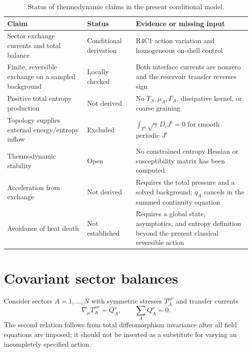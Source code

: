 \documentclass[aps,prd,reprint,superscriptaddress,nofootinbib,floatfix]{revtex4-2}
\newcommand{\Tthree}{T^{3}}
\begin{document}
\begin{table}[t]
\caption{Status of thermodynamic claims in the present conditional model.}
\label{tab:claims}
\begin{ruledtabular}
\begin{tabular}{p{}p{}p{}}
Claim & Status & Evidence or missing input \\
\hline
Sector exchange currents and total balance & Conditional derivation &
R4C1 action variation and homogeneous on-shell control \\
Finite, reversible exchange on a sampled background & Locally checked &
Both interface currents are nonzero and the reservoir transfer reverses sign \\
Positive total entropy production & Not derived &
No \(T_A,\mu_A,\Gamma_A\), dissipative kernel, or coarse graining \\
Topology supplies external energy/entropy inflow & Excluded &
\(\int_{\Tthree}\sqrt{\gamma}\,D_iJ^i=0\) for smooth periodic \(J^i\) \\
Thermodynamic stability & Open &
No constrained entropy Hessian or susceptibility matrix has been computed \\
Acceleration from exchange & Not derived &
Requires the total pressure and a solved background; \(q_A\) cancels in the
summed continuity equation \\
Avoidance of heat death & Not established &
Requires a global state, asymptotics, and entropy definition beyond the
present classical reversible action \\
\end{tabular}
\end{ruledtabular}
\end{table}

\section{Covariant sector balances}
\label{sec:balances}

Consider sectors \(A=1,\ldots,N\) with symmetric stresses
\(T_A^{\mu\nu}\) and transfer currents
\begin{equation}
 \nabla_\mu T_A^{\mu\nu}=Q_A^\nu,
 \qquad
 \sum_A Q_A^\nu=0.
 \label{eq:sector-balance}
\end{equation}
The second relation follows from total diffeomorphism invariance after all
field equations are imposed; it should not be inserted as a substitute for
varying an incompletely specified action.
\end{document}
